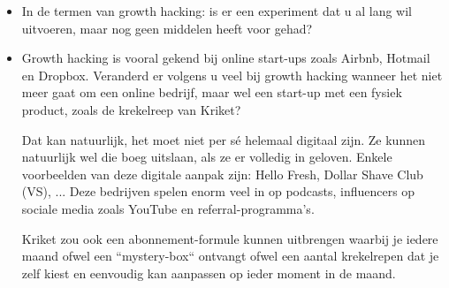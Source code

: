 \begin{itemize}
\begin{enumerate}[label*=\arabic*.]
	\end{enumerate}
	\item In de termen van growth hacking: is er een experiment dat u al lang wil uitvoeren, maar nog geen middelen heeft voor gehad?
	
		
	
	\item Growth hacking is vooral gekend bij online start-ups zoals Airbnb, Hotmail en Dropbox. Veranderd er volgens u veel bij growth hacking wanneer het niet meer gaat om een online bedrijf, maar wel een start-up met een fysiek product, zoals de krekelreep van Kriket?
	
	Dat kan natuurlijk, het moet niet per sé helemaal digitaal zijn. Ze kunnen natuurlijk wel die boeg uitslaan, als ze er volledig in geloven. Enkele voorbeelden van deze digitale aanpak zijn: Hello Fresh, Dollar Shave Club (VS), ... Deze bedrijven spelen enorm veel in op podcasts, influencers op sociale media zoals YouTube en referral-programma's. 
	
	Kriket zou ook een abonnement-formule kunnen uitbrengen waarbij je iedere maand ofwel een ``mystery-box`` ontvangt ofwel een aantal krekelrepen dat je zelf kiest en eenvoudig kan aanpassen op ieder moment in de maand.
	
\end{itemize}

